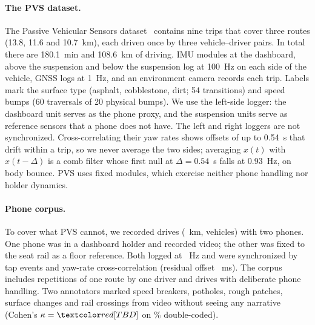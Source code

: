 \paragraph{The PVS dataset.}
The Passive Vehicular Sensors dataset~\cite{menegazzo2021pvs} contains nine trips that cover three routes (13.8, 11.6 and 10.7~km), each driven once by three vehicle--driver pairs.
In total there are 180.1~min and 108.6~km of driving.
IMU modules at the dashboard, above the suspension and below the suspension log at 100~Hz on each side of the vehicle, GNSS logs at 1~Hz, and an environment camera records each trip.
Labels mark the surface type (asphalt, cobblestone, dirt; 54 transitions) and speed bumps (60 traversals of 20 physical bumps).
We use the left-side logger: the dashboard unit serves as the phone proxy, and the suspension units serve as reference sensors that a phone does not have.
The left and right loggers are not synchronized.
Cross-correlating their yaw rates shows offsets of up to 0.54~s that drift within a trip, so we never average the two sides; averaging $x(t)$ with $x(t-\Delta)$ is a comb filter whose first null at $\Delta=0.54$~s falls at 0.93~Hz, on body bounce.
PVS uses fixed modules, which exercise neither phone handling nor holder dynamics.

\paragraph{Phone corpus.}
To cover what PVS cannot, we recorded \TBD{} drives (\TBD{}~km, \TBD{} vehicles) with two phones.
One phone was in a dashboard holder and recorded video; the other was fixed to the seat rail as a floor reference.
Both logged at \TBD{}~Hz and were synchronized by tap events and yaw-rate cross-correlation (residual offset \TBD{}~ms).
The corpus includes \TBD{} repetitions of one route by one driver and \TBD{} drives with deliberate phone handling.
Two annotators marked speed breakers, potholes, rough patches, surface changes and rail crossings from video without seeing any narrative (Cohen's $\kappa=\TBD{}$ on \TBD{}\% double-coded).

